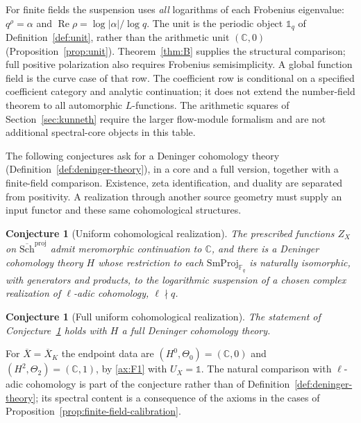 \documentclass[11pt]{amsart}
\theoremstyle{plain}
\newtheorem{conjecture}[theorem]{Conjecture}
\theoremstyle{definition}
\theoremstyle{remark}
\numberwithin{equation}{section}
\newcommand{\C}{\mathbb{C}}
\newcommand{\F}{\mathbb{F}}
\newcommand{\Xbar}{\overline{X}}
\newcommand{\Schbar}{\overline{\mathrm{Sch}}}
\newcommand{\SmProj}{\mathrm{SmProj}}
\DeclareMathOperator{\Rea}{Re}
\renewcommand{\Re}{\Rea}
\begin{document}
For finite fields the suspension uses \emph{all} logarithms of each
Frobenius eigenvalue: $q^\rho=\alpha$ and
$\Re\rho=\log|\alpha|/\log q$. The unit is the periodic object
$\mathbb 1_q$ of Definition~\ref{def:unit}, rather than the arithmetic
unit $(\C,0)$ (Proposition~\ref{prop:unit}). Theorem~\ref{thm:B}
supplies the structural comparison; full positive polarization also
requires Frobenius semisimplicity. A global function field is the
curve case of that row. The coefficient row is conditional on a
specified coefficient category and analytic continuation; it does not
extend the number-field theorem to all automorphic $L$-functions.
The arithmetic squares of Section~\ref{sec:kunneth} require the larger
flow-module formalism and are not additional spectral-core objects in
this table.


The following conjectures ask for a Deninger cohomology theory
(Definition~\ref{def:deninger-theory}), in a core and a full version,
together with a finite-field comparison. Existence, zeta
identification, and duality are separated from positivity. A
realization through another source geometry must supply an input
functor and these same cohomological structures.



\begin{conjecture}[Uniform cohomological realization]
\label{conj:arithmetic-realization}
The prescribed functions $Z_X$ on $\Schbar^{\mathrm{proj}}$ admit
meromorphic continuation to $\C$, and there is a Deninger cohomology
theory $H$ whose restriction to each $\SmProj_{\F_q}$ is naturally
isomorphic, with generators and products, to the logarithmic
suspension of a chosen complex realization of $\ell$-adic cohomology,
$\ell\nmid q$.
\end{conjecture}

\begin{conjecture}[Full uniform cohomological realization]
\label{conj:arithmetic-realization-full}
The statement of Conjecture~\ref{conj:arithmetic-realization} holds
with $H$ a full Deninger cohomology theory.
\end{conjecture}

For $\Xbar=\Xbar_K$ the endpoint data are $(H^0,\Theta_0)=(\C,0)$ and
$(H^2,\Theta_2)=(\C,1)$, by \ref{ax:F1} with $U_X=\mathbb 1$. The
natural comparison with $\ell$-adic cohomology is part of the
conjecture rather than of Definition~\ref{def:deninger-theory}; its
spectral content is a consequence of the axioms in the cases of
Proposition~\ref{prop:finite-field-calibration}.
\end{document}
